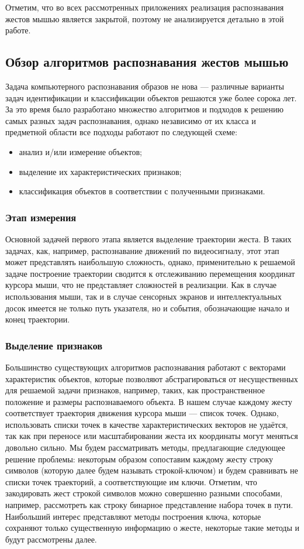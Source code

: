 \documentclass[a5paper]{article}
\begin{document}
Отметим, что во всех рассмотренных приложениях реализация распознавания жестов мышью является закрытой, поэтому не анализируется детально в этой работе.

\subsection{Обзор алгоритмов распознавания жестов мышью}
Задача компьютерного распознавания образов не нова --- различные варианты задач идентификации и классификации объектов решаются уже более сорока лет. За это время было разработано множество алгоритмов и подходов к решению самых разных задач распознавания, однако независимо от их класса и предметной области все подходы работают по следующей схеме: 
\begin{itemize}
  \item анализ и/или измерение объектов;
  \item выделение их характеристических признаков;
  \item классификация объектов в соответствии с полученными признаками.
\end{itemize}

\subsubsection{Этап измерения}
Основной задачей первого этапа является выделение траектории жеста. В таких задачах, как, например, распознавание движений по видеосигналу, этот этап может представлять наибольшую сложность, однако, применительно к решаемой задаче построение траектории сводится к отслеживанию перемещения координат курсора мыши, что не представляет сложностей в реализации. Как в случае использования мыши, так и в случае сенсорных экранов и интеллектуальных досок имеется не только путь указателя, но и события, обозначающие начало и конец траектории.

\subsubsection{Выделение признаков}
Большинство существующих алгоритмов распознавания работают с векторами характеристик объектов, которые позволяют абстрагироваться от несущественных для решаемой задачи признаков, например, таких, как пространственное положение и размеры распознаваемого объекта. В нашем случае каждому жесту соответствует траектория движения курсора мыши --- список точек. Однако, использовать списки точек в качестве характеристических векторов не удаётся, так как при переносе или масштабировании жеста их координаты могут меняться довольно сильно. Мы будем рассматривать методы, предлагающие следующее решение проблемы: некоторым образом сопоставим каждому жесту строку символов (которую далее будем называть строкой-ключом) и будем сравнивать не списки точек траекторий, а соответствующие им ключи. Отметим, что закодировать жест строкой символов можно совершенно разными способами, например, рассмотреть как строку бинарное представление набора точек в пути. Наибольший интерес представляют методы построения ключа, которые сохраняют только существенную информацию о жесте, некоторые такие методы и будут рассмотрены далее.
\end{document}
